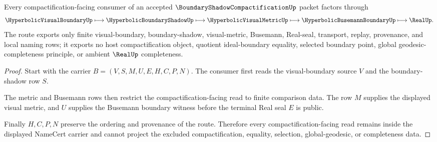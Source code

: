 \begin{theorem}
\label{thm:boundary-shadow-compactification-visual-boundary-route}
Every compactification-facing consumer of an accepted $\BoundaryShadowCompactificationUp$ packet factors through
$$
\HyperbolicVisualBoundaryUp
\longmapsto
\HyperbolicBoundaryShadowUp
\longmapsto
\HyperbolicVisualMetricUp
\longmapsto
\HyperbolicBusemannBoundaryUp
\longmapsto
\RealUp .
$$
The route exports only finite visual-boundary, boundary-shadow, visual-metric, Busemann, Real-seal, transport, replay, provenance, and local naming rows; it exports no host compactification object, quotient ideal-boundary equality, selected boundary point, global geodesic-completeness principle, or ambient $\RealUp$ completeness.
\end{theorem}
\begin{proof}
Start with the carrier $B=(V,S,M,U,E,H,C,P,N)$. The consumer first reads the visual-boundary source $V$ and the boundary-shadow row $S$.

The metric and Busemann rows then restrict the compactification-facing read to finite comparison data. The row $M$ supplies the displayed visual metric, and $U$ supplies the Busemann boundary witness before the terminal Real seal $E$ is public.

Finally $H,C,P,N$ preserve the ordering and provenance of the route. Therefore every compactification-facing read remains inside the displayed NameCert carrier and cannot project the excluded compactification, equality, selection, global-geodesic, or completeness data.
\end{proof}



